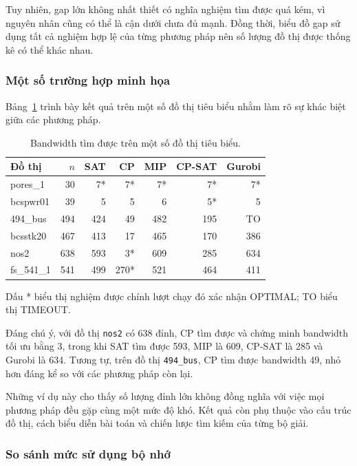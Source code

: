 \documentclass[a4paper,fleqn]{cas-sc}
\newcommand{\code}[1]{\nolinkurl{#1}}
\begin{document}
Tuy nhiên, gap lớn không nhất thiết có nghĩa nghiệm tìm được quá kém, vì nguyên nhân cũng có thể là cận dưới chưa đủ mạnh. Đồng thời, biểu đồ gap sử dụng tất cả nghiệm hợp lệ của từng phương pháp nên số lượng đồ thị được thống kê có thể khác nhau.

\subsubsection{Một số trường hợp minh họa}

Bảng~\ref{tab:examples} trình bày kết quả trên một số đồ thị tiêu biểu nhằm làm rõ sự khác biệt giữa các phương pháp.

\begin{table}[pos=H]
\centering
\caption{Bandwidth tìm được trên một số đồ thị tiêu biểu.}
\label{tab:examples}
\small
\begin{tabular}{lrrrrrr}
\toprule
\textbf{Đồ thị} & \textbf{$n$} & \textbf{SAT} & \textbf{CP} & \textbf{MIP} & \textbf{CP-SAT} & \textbf{Gurobi} \\
\midrule
pores\_1 & 30 & 7* & 7* & 7* & 7* & 7* \\
bcspwr01 & 39 & 5 & 5 & 6 & 5* & 5 \\
494\_bus & 494 & 424 & 49 & 482 & 195 & TO \\
bcsstk20 & 467 & 413 & 17 & 465 & 170 & 386 \\
nos2 & 638 & 593 & 3* & 609 & 285 & 634 \\
fs\_541\_1 & 541 & 499 & 270* & 521 & 464 & 411 \\
\bottomrule
\end{tabular}
\end{table}

\noindent\footnotesize{Dấu * biểu thị nghiệm được chính lượt chạy đó xác nhận OPTIMAL; TO biểu thị TIMEOUT.}\normalsize

Đáng chú ý, với đồ thị \code{nos2} có 638 đỉnh, CP tìm được và chứng minh bandwidth tối ưu bằng 3, trong khi SAT tìm được 593, MIP là 609, CP-SAT là 285 và Gurobi là 634. Tương tự, trên đồ thị \code{494_bus}, CP tìm được bandwidth 49, nhỏ hơn đáng kể so với các phương pháp còn lại.

Những ví dụ này cho thấy số lượng đỉnh lớn không đồng nghĩa với việc mọi phương pháp đều gặp cùng một mức độ khó. Kết quả còn phụ thuộc vào cấu trúc đồ thị, cách biểu diễn bài toán và chiến lược tìm kiếm của từng bộ giải.

\FloatBarrier


\subsubsection{So sánh mức sử dụng bộ nhớ}
\end{document}
